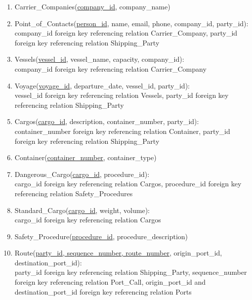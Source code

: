 \documentclass[11pt]{article}
\begin{document}
\begin{enumerate}
    \item Carrier\_Companies(\underline{company\_id}, company\_name)
    
    \item Point\_of\_Contacts(\underline{person\_id}, name, email, phone, company\_id, party\_id):\\
    company\_id foreign key referencing relation Carrier\_Company, party\_id foreign key referencing relation Shipping\_Party
    
    \item Vessels(\underline{vessel\_id}, vessel\_name, capacity, company\_id):\\
    company\_id foreign key referencing relation Carrier\_Company
    
    \item Voyage(\underline{voyage\_id}, departure\_date, vessel\_id, party\_id):\\
    vessel\_id foreign key referencing relation Vessels, party\_id foreign key referencing relation Shipping\_Party
    
    \item Cargos(\underline{cargo\_id}, description, container\_number, party\_id):\\
    container\_number foreign key referencing relation Container, party\_id foreign key referencing relation Shipping\_Party
    
    \item Container(\underline{container\_number}, container\_type)
    
    \item Dangerous\_Cargo(\underline{cargo\_id}, procedure\_id):\\
    cargo\_id foreign key referencing relation Cargos, procedure\_id foreign key referencing relation Safety\_Procedures
    
    \item Standard\_Cargo(\underline{cargo\_id}, weight, volume):\\
    cargo\_id foreign key referencing relation Cargos
    
    \item Safety\_Procedure(\underline{procedure\_id}, procedure\_description)
    
    \item Route(\underline{party\_id, sequence\_number, route\_number}, origin\_port\_id, destination\_port\_id):\\
    party\_id foreign key referencing relation Shipping\_Party, sequence\_number foreign key referencing relation Port\_Call, origin\_port\_id and destination\_port\_id foreign key referencing relation Ports
    

\end{enumerate}
\end{document}
